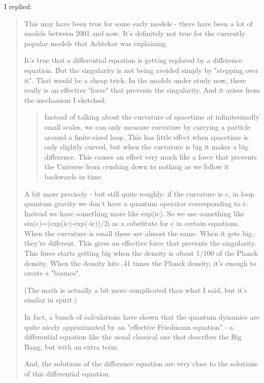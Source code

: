 I replied:

\begin{quote}

This may have been true for some early models - there have been a lot
of models between 2001 and now.  It's definitely not true for the
currently popular models that Ashtekar was explaining.

It's true that a differential equation is getting replaced by a
difference equation.  But the singularity is not being avoided simply
by "stepping over it".  That would be a cheap trick.  In the models
under study now, there really is an effective "force" that prevents
the singularity.  And it arises from the mechanism I sketched:

\begin{quote}
Instead of talking about the curvature of spacetime at infinitesimally
small scales, we can only measure curvature by carrying a particle
around a finite-sized loop. This has little effect when spacetime is
only slightly curved, but when the curvature is big it makes a big
difference. This causes an effect very much like a force that prevents
the Universe from crushing down to nothing as we follow it backwards
in time.
\end{quote}

A bit more precisely - but still quite roughly: if the curvature is c,
in loop quantum gravity we don't have a quantum operator corresponding
to c.  Instead we have something more like exp(ic).  So we use
something like sin(c)=(exp(ic)-exp(-ic))/2i as a substitute for c in
certain equations.  When the curvature is small these are almost the
same.  When it gets big, they're different.  This gives an effective
force that prevents the singularity.  This force starts getting big
when the density is about 1/100 of the Planck density.  When the
density hits .41 times the Planck density, it's enough to create a
"bounce".

(The math is actually a bit more complicated than what I said, but
it's similar in spirit.)

In fact, a bunch of calculations have shown that the quantum dynamics
are quite nicely approximated by an "effective Friedmann equation" - a
differential equation like the usual classical one that describes the
Big Bang, but with an extra term.

And, the solutions of the difference equation are very close to the
solutions of this differential equation.

\end{quote}


